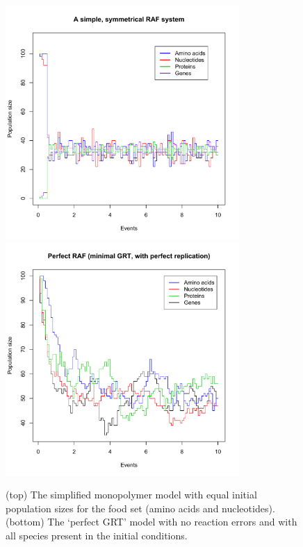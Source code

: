 \documentclass{article}
\begin{document}
{\begin{figure}
    \centering
    	\quad
    	\includegraphics[width=3.5in]{InitiallyOnlyNucAndAAInitiallyUncatalyzed.pdf}
    	\quad
    	\includegraphics[width=3.5in]{PerfectRAF(minimalGRTnoError).pdf}
    \caption{(top) The simplified monopolymer model with equal initial population sizes for the food set (amino acids and nucleotides).  
    (bottom) The `perfect GRT' model with no reaction errors and with all species present in the initial conditions.}
	\label{fig:monopolymer}
\end{figure}

}
\end{document}
